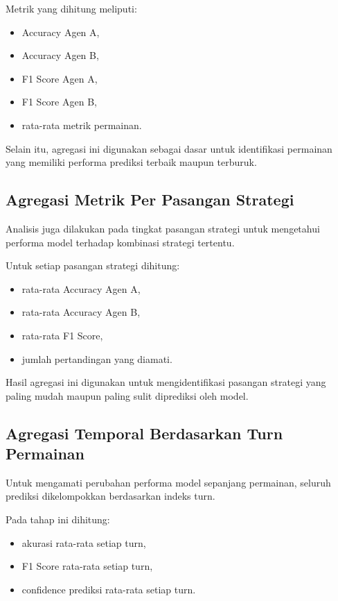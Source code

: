 Metrik yang dihitung meliputi:

\begin{itemize}
\item Accuracy Agen A,
\item Accuracy Agen B,
\item F1 Score Agen A,
\item F1 Score Agen B,
\item rata-rata metrik permainan.
\end{itemize}

Selain itu, agregasi ini digunakan sebagai dasar untuk identifikasi permainan yang memiliki performa prediksi terbaik maupun terburuk.

\subsection{Agregasi Metrik Per Pasangan Strategi}

Analisis juga dilakukan pada tingkat pasangan strategi untuk mengetahui performa model terhadap kombinasi strategi tertentu.

Untuk setiap pasangan strategi dihitung:

\begin{itemize}
\item rata-rata Accuracy Agen A,
\item rata-rata Accuracy Agen B,
\item rata-rata F1 Score,
\item jumlah pertandingan yang diamati.
\end{itemize}

Hasil agregasi ini digunakan untuk mengidentifikasi pasangan strategi yang paling mudah maupun paling sulit diprediksi oleh model.

\subsection{Agregasi Temporal Berdasarkan Turn Permainan}

Untuk mengamati perubahan performa model sepanjang permainan, seluruh prediksi dikelompokkan berdasarkan indeks turn.

Pada tahap ini dihitung:

\begin{itemize}
\item akurasi rata-rata setiap turn,
\item F1 Score rata-rata setiap turn,
\item confidence prediksi rata-rata setiap turn.
\end{itemize}

